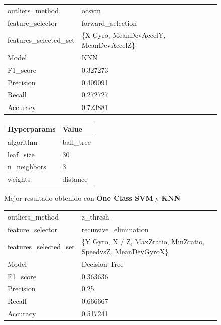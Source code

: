 \begin{appendices}
		\begin{figure}[htb]
			\centering
			\begin{tabular}{ll}
				\toprule
					  outliers\_method &                                  ocsvm \\
					 feature\_selector &                      forward\_selection \\
				features\_selected\_set & \{X Gyro, MeanDevAccelY, MeanDevAccelZ\} \\
								Model &                                    KNN \\
						F1\_score &                               0.327273 \\
					   Precision &                               0.409091 \\
						  Recall &                               0.272727 \\
						Accuracy &                               0.723881 \\
				\bottomrule
			\end{tabular}
			\newline
			\newline

			\begin{tabular}{ll}
				\toprule
				Hyperparams &     Value \\
				\midrule
				  algorithm & ball\_tree \\
				  leaf\_size &        30 \\
				n\_neighbors &         3 \\
					weights &  distance \\
				\bottomrule
			\end{tabular}
			\caption{Mejor resultado obtenido con \textbf{One Class SVM} y \textbf{KNN}}
			\label{table:13}
		\end{figure}

		\begin{figure}[htb]
			\centering
			\begin{tabular}{ll}
				\toprule
					  outliers\_method &                                           z\_thresh \\
					 feature\_selector &                              recursive\_elimination \\
					 features\_selected\_set & \{Y Gyro, X / Z, MaxZratio, MinZratio, SpeedvsZ, MeanDevGyroX\} \\
								Model &                                      Decision Tree \\
						F1\_score &                                           0.363636 \\
					   Precision &                                               0.25 \\
						  Recall &                                           0.666667 \\
						Accuracy &                                           0.517241 \\
				\bottomrule
			\end{tabular}
			\newline
			\newline


\end{figure}
\end{appendices}
